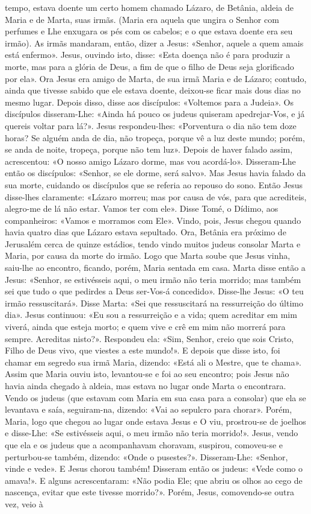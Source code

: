 \begin{paracol}{2}
{ tempo, estava doente um certo homem chamado Lázaro, de Betânia, aldeia de Maria e de Marta, suas irmãs. (Maria era aquela que ungira o Senhor com perfumes e Lhe enxugara os pés com os cabelos; e o que estava doente era seu irmão). As irmãs mandaram, então, dizer a Jesus: «Senhor, aquele a quem amais está enfermo». Jesus, ouvindo isto, disse: «Esta doença não é para produzir a morte, mas para a glória de Deus, a fim de que o filho de Deus seja glorificado por ela». Ora Jesus era amigo de Marta, de sua irmã Maria e de Lázaro; contudo, ainda que tivesse sabido que ele estava doente, deixou-se ficar mais dous dias no mesmo lugar. Depois disso, disse aos discípulos: «Voltemos para a Judeia». Os discípulos disseram-Lhe: «Ainda há pouco os judeus quiseram apedrejar-Vos, e já quereis voltar para lá?». Jesus respondeu-lhes: «Porventura o dia não tem doze horas? Se alguém anda de dia, não tropeça, porque vê a luz deste mundo; porém, se anda de noite, tropeça, porque não tem luz». Depois de haver falado assim, acrescentou: «O nosso amigo Lázaro dorme, mas vou acordá-lo». Disseram-Lhe então os discípulos: «Senhor, se ele dorme, será salvo». Mas Jesus havia falado da sua morte, cuidando os discípulos que se referia ao repouso do sono. Então Jesus disse-lhes claramente: «Lázaro morreu; mas por causa de vós, para que acrediteis, alegro-me de lá não estar. Vamos ter com ele». Disse Tomé, o Dídimo, aos companheiros: «Vamos e morramos com Ele». Vindo, pois, Jesus chegou quando havia quatro dias que Lázaro estava sepultado. Ora, Betânia era próximo de Jerusalém cerca de quinze estádios, tendo vindo muitos judeus consolar Marta e Maria, por causa da morte do irmão. Logo que Marta soube que Jesus vinha, saiu-lhe ao encontro, ficando, porém, Maria sentada em casa. Marta disse então a Jesus: «Senhor, se estivésseis aqui, o meu irmão não teria morrido; mas também sei que tudo o que pedirdes a Deus ser-Vos-á concedido». Disse-lhe Jesus: «O teu irmão ressuscitará». Disse Marta: «Sei que ressuscitará na ressurreição do último dia». Jesus continuou: «Eu sou a ressurreição e a vida; quem acreditar em mim viverá, ainda que esteja morto; e quem vive e crê em mim não morrerá para sempre. Acreditas nisto?». Respondeu ela: «Sim, Senhor, creio que sois Cristo, Filho de Deus vivo, que viestes a este mundo!». E depois que disse isto, foi chamar em segredo sua irmã Maria, dizendo: «Está ali o Mestre, que te chama». Assim que Maria ouviu isto, levantou-se e foi ao seu encontro; pois Jesus não havia ainda chegado à aldeia, mas estava no lugar onde Marta o encontrara. Vendo os judeus (que estavam com Maria em sua casa para a consolar) que ela se levantava e saía, seguiram-na, dizendo: «Vai ao sepulcro para chorar». Porém, Maria, logo que chegou ao lugar onde estava Jesus e O viu, prostrou-se de joelhos e disse-Lhe: «Se estivésseis aqui, o meu irmão não teria morrido!». Jesus, vendo que ela e os judeus que a acompanhavam choravam, suspirou, comoveu-se e perturbou-se também, dizendo: «Onde o pusestes?». Disseram-Lhe: «Senhor, vinde e vede». E Jesus chorou também! Disseram então os judeus: «Vede como o amava!». E alguns acrescentaram: «Não podia Ele; que abriu os olhos ao cego de nascença, evitar que este tivesse morrido?». Porém, Jesus, comovendo-se outra vez, veio à }
\end{paracol}
